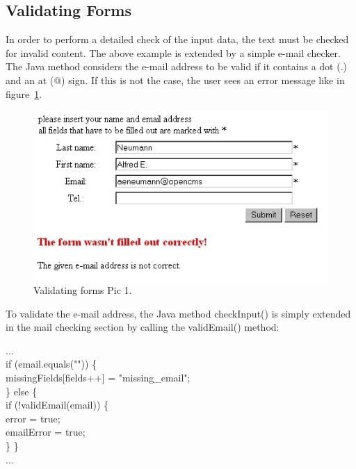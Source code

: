 \subsection{Validating Forms}

In order to perform a detailed check of the input data, the text must be
checked for invalid content. The above example is extended by a simple
e-mail checker. The Java method considers the e-mail address to be
valid if it contains a dot (.) and an at (@) sign. 
If this is not the case, the user sees an error message like in figure~\ref{ValidaForms}.

\begin{figure}
\begin{center}
\includegraphics[clip,width=0.7\linewidth]{pics/modules/43}
\end{center}
\caption[Validating forms Pic 1]{Validating forms Pic 1.}
\label{ValidaForms}
\end{figure}

To validate the e-mail address, the Java method {\meth checkInput()} is simply
extended in the mail checking section by calling the {\meth validEmail()} method:

\begin{java}
...\\
if (email.equals("")) \{\\
\jtabc        missingFields[fields++] = "missing\_email";\\
\jtabc       \} else \{\\
\jtabc        if (!validEmail(email)) \{\\
\jtabe                error = true;\\
\jtabe                emailError = true;\\
\jtabc        \}
\}\\
...\\
\end{java}

